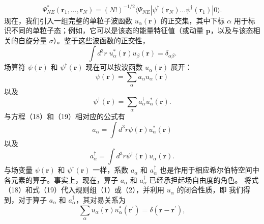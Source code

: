 \begin{equation}\tag{11.1.23}\label{eq:11.1.23}
\Psi _ { N E } ^{*} ( \pmb { r } _ { 1 } , \ldots , \pmb { r } _ { N } ) = ( N ! ) ^{- 1 / 2} \langle \Psi _ { N E } | \psi ^{\dagger} ( \pmb { r } _ { N } ) \ldots \psi ^{\dagger} ( \pmb { r } _ { 1 } ) | 0 \rangle .
\end{equation}
现在，我们引入一组完整的单粒子波函数 \(u_{\alpha}(\mathbf{r})\) 的正交集，其中下标 \(\alpha\) 用于标识不同的单粒子态；例如，它可以是该态的能量特征值（或动量 \(\mathbf{p}\)，以及与该态相关的自旋分量 \(\sigma\)）。鉴于这些波函数的正交性，
\begin{equation}\tag{11.1.24}\label{eq:11.1.24}
\int d ^{3} r \; u _ { \alpha } ^{*} ( \boldsymbol { r } ) u _ { \beta } ( \boldsymbol { r } ) = \delta _ { \alpha \beta } .
\end{equation}
场算符 \(\psi(\boldsymbol{r})\) 和 \(\psi^{\dagger}(\boldsymbol{r})\) 现在可以按波函数 \(u_{\alpha}(\boldsymbol{r})\) 展开：
\begin{equation}\tag{11.1.25}\label{eq:11.1.25}
\psi ( \boldsymbol { r } ) = \sum _ { \alpha } a _ { \alpha } u _ { \alpha } ( \boldsymbol { r } )
\end{equation}
以及
\begin{equation}\tag{11.1.26}\label{eq:11.1.26}
\psi ^{\dagger} ( \pmb { r } ) = \sum _ { \alpha } a _ { \alpha } ^{\dagger} u _ { \alpha } ^{*} ( \pmb { r } ) .
\end{equation}
与方程（18）和（19）相对应的公式有
\begin{equation}\tag{11.1.27}\label{eq:11.1.27}
a _ { \alpha } = \int d ^{3} r \psi ( \mathbf { r } ) u _ { \alpha } ^{*} ( \mathbf { r } )
\end{equation}
以及
\begin{equation}\tag{11.1.28}\label{eq:11.1.28}
a _ { \alpha } ^{\dagger} = \int d ^{3} r \psi ^{\dagger} ( \pmb { r } ) u _ { \alpha } ( \pmb { r } ) .
\end{equation}
与场变量 \(\psi(\boldsymbol{r})\) 和 \(\psi^{\dagger}(\boldsymbol{r})\) 一样，系数 \(a_{\alpha}\) 和 \(a_{\alpha}^{\dagger}\) 也是作用于相应希尔伯特空间中各元素的算子。事实上，现在，算子 \(a_{\alpha}\) 和 \(a_{\alpha}^{\dagger}\) 已经承担起场自由度的角色。
将式（18）和式（19）代入规则组（1）或（2），并利用 \(u_{\alpha}\) 的闭合性质，即
我们得到，对于算子 \(a_{\alpha}\) 和 \(a_{\alpha}^{\dagger}\)，其对易关系为
\begin{equation}\tag{11.1.29}\label{eq:11.1.29}
\sum _ { \alpha } u _ { \alpha } ( \boldsymbol { r } ) u _ { \alpha } ^{*} ( \boldsymbol { r } ^{\prime} ) = \delta ( \boldsymbol { r } - \boldsymbol { r } ^{\prime} ) ,
\end{equation}
